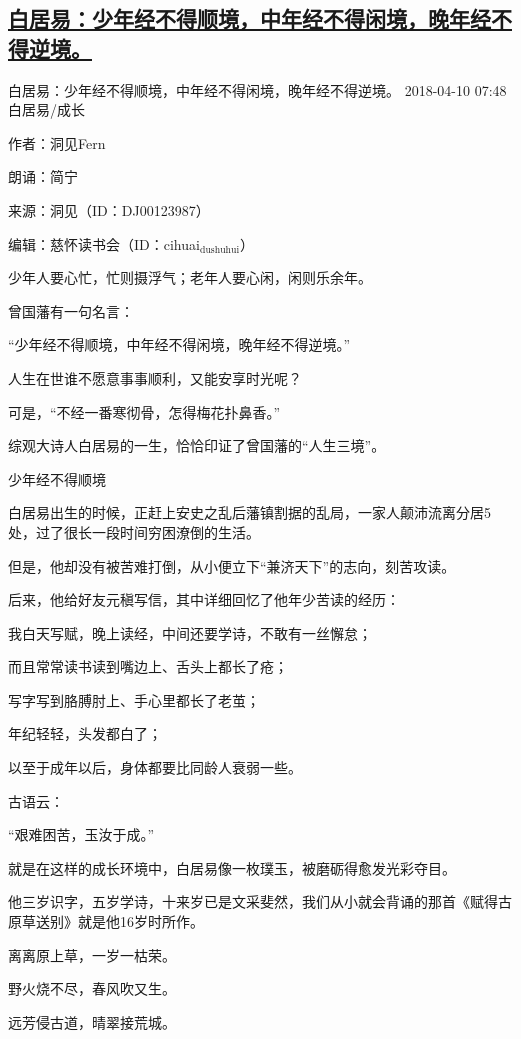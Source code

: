 \documentclass[11pt]{ctexart}
\begin{document}
{{{{\subsection{\href{http://www.sohu.com/a/227757055\_120943?\_f=index\_chan12news\_27}{白居易：少年经不得顺境，中年经不得闲境，晚年经不得逆境。}}
\label{sec:org047a59a}
白居易：少年经不得顺境，中年经不得闲境，晚年经不得逆境。
2018-04-10 07:48 白居易/成长

作者：洞见Fern

朗诵：简宁

来源：洞见（ID：DJ00123987）

编辑：慈怀读书会（ID：cihuai\(_{\text{dushuhui}}\)）

少年人要心忙，忙则摄浮气；老年人要心闲，闲则乐余年。

曾国藩有一句名言：

“少年经不得顺境，中年经不得闲境，晚年经不得逆境。”

人生在世谁不愿意事事顺利，又能安享时光呢？

可是，“不经一番寒彻骨，怎得梅花扑鼻香。”

综观大诗人白居易的一生，恰恰印证了曾国藩的“人生三境”。



少年经不得顺境

白居易出生的时候，正赶上安史之乱后藩镇割据的乱局，一家人颠沛流离分居5处，过了很长一段时间穷困潦倒的生活。

但是，他却没有被苦难打倒，从小便立下“兼济天下”的志向，刻苦攻读。

后来，他给好友元稹写信，其中详细回忆了他年少苦读的经历：

我白天写赋，晚上读经，中间还要学诗，不敢有一丝懈怠；

而且常常读书读到嘴边上、舌头上都长了疮；

写字写到胳膊肘上、手心里都长了老茧；

年纪轻轻，头发都白了；

以至于成年以后，身体都要比同龄人衰弱一些。

古语云：

“艰难困苦，玉汝于成。”

就是在这样的成长环境中，白居易像一枚璞玉，被磨砺得愈发光彩夺目。

他三岁识字，五岁学诗，十来岁已是文采斐然，我们从小就会背诵的那首《赋得古原草送别》就是他16岁时所作。

离离原上草，一岁一枯荣。

野火烧不尽，春风吹又生。

远芳侵古道，晴翠接荒城。

}}}}
\end{document}
